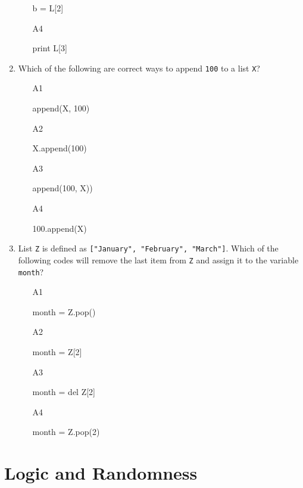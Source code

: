 \begin{enumerate}
\begin{enumerate}
\begin{bluecode}
b = L[2]
\end{bluecode}
\item[A4] 
\begin{bluecode}
print L[3]
\end{bluecode}
\end{enumerate}
\item Which of the following are correct ways to append {\tt 100} to a list {\tt X}?
\begin{enumerate}
\item[A1] 
\begin{bluecode}
append(X, 100)
\end{bluecode}
\item[A2] 
\begin{bluecode}
X.append(100)
\end{bluecode}
\item[A3] 
\begin{bluecode}
append(100, X))
\end{bluecode}
\item[A4] 
\begin{bluecode}
100.append(X)
\end{bluecode}
\end{enumerate}
\item List {\tt Z} is defined as {\tt ["January", "February", "March"]}.
Which of the following codes will remove the last item from {\tt Z} 
and assign it to the variable {\tt month}?
\begin{enumerate}
\item[A1] 
\begin{bluecode}
month = Z.pop()
\end{bluecode}
\item[A2] 
\begin{bluecode}
month = Z[2]
\end{bluecode}
\item[A3] 
\begin{bluecode}
month = del Z[2]
\end{bluecode}
\item[A4] 
\begin{bluecode}
month = Z.pop(2)
\end{bluecode}
\end{enumerate}
\end{enumerate}


\section{Logic and Randomness}

